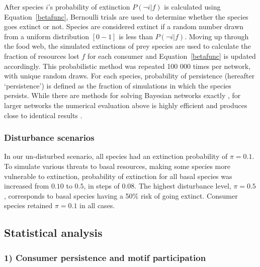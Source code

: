 \documentclass[12pt]{article}
\begin{document}
\begin{spacing}{1.0}
    		
            After species $i$'s probability of extinction $P(\lnot i|f)$ is calculated using Equation~\ref{betafunc}, Bernoulli trials are used to determine whether the species goes extinct or not. 
            Species are considered extinct if a random number drawn from a uniform distribution $[0-1]$ is less than $P(\lnot i|f)$.
            Moving up through the food web, the simulated extinctions of prey species are used to calculate the fraction of resources lost $f$ for each consumer and Equation~\ref{betafunc} is updated accordingly. 
            This probabilistic method was repeated 100 000 times per network, with unique random draws.
            For each species, probability of persistence (hereafter `persistence') is defined as the fraction of simulations in which the species persists. 
            While there are methods for solving Bayesian networks exactly \citep{Eklof2013}, for larger networks the numerical evaluation above is highly efficient and produces close to identical results \citep{Haussler2020}.
    		
    	
		
        \subsubsection*{Disturbance scenarios}
        
            In our un-disturbed scenario, all species had an extinction probability of $\pi = 0.1$. 
            To simulate various threats to basal resources, making some species more vulnerable to extinction, probability of extinction for all basal species was increased from $0.10$ to $0.5$, in steps of $0.08$. 
            The highest disturbance level, $\pi = 0.5$, corresponds to basal species having a 50\% risk of going extinct. 
            Consumer species retained $\pi=0.1$ in all cases.


	\subsection*{Statistical analysis} 
        
        \subsubsection*{1) Consumer persistence and motif participation}


\end{spacing}
\end{document}
